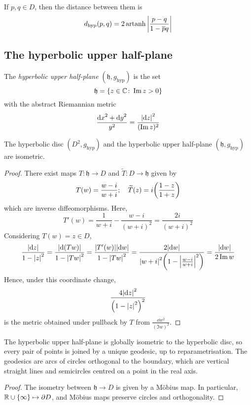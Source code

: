 \begin{corollary}
	If \( p, q \in D \), then the distance between them is
	\[
		d_{\text{hyp}}(p,q) = 2 \operatorname{artanh} \abs{\frac{p-q}{1-\overline p q}}
	\]
\end{corollary}

\subsection{The hyperbolic upper half-plane}
\begin{definition}
	The \textit{hyperbolic upper half-plane} \( (\mathfrak{h},g_{\text{hyp}}) \) is the set
	\[
		\mathfrak{h} = \qty{z \in \mathbb C \colon \Im z > 0}
	\]
	with the abstract Riemannian metric
	\[
		\frac{\dd{x}^2 + \dd{y}^2}{y^2} = \frac{\abs{\dd{z}}^2}{(\Im z)^2}
	\]
\end{definition}
\begin{lemma}
	The hyperbolic disc \( (D^2, g_{\text{hyp}}) \) and the hyperbolic upper half-plane \( (\mathfrak{h},g_{\text{hyp}}) \) are isometric.
\end{lemma}
\begin{proof}
	There exist maps \( T \colon \mathfrak{h} \to D \) and \( \widetilde T \colon D \to \mathfrak{h} \) given by
	\[
		T(w) = \frac{w-i}{w+i};\quad \widetilde T(z) = i\qty(\frac{1-z}{1+z})
	\]
	which are inverse diffeomorphisms.
	Here,
	\[
		T'(w) = \frac{1}{w+i} - \frac{w-i}{(w+i)^2} = \frac{2i}{(w+i)^2}
	\]
	Considering \( T(w) = z \in D \),
	\[
		\frac{\abs{\dd{z}}}{1-\abs{z}^2} = \frac{\abs{\dd{(Tw)}}}{1-\abs{T w}^2} = \frac{\abs{T'(w)} \abs{\dd{w}}}{1-\abs{Tw}^2} = \frac{2 \abs{\dd{w}}}{\abs{w+i}^2 \qty(1 - \abs{\frac{w-i}{w+i}}^2)} = \frac{\abs{\dd{w}}}{2\Im w}
	\]
	Hence, under this coordinate change,
	\[
		\frac{4 \abs{\dd{z}}^2}{\qty(1 - \abs{z}^2)^2}
	\]
	is the metric obtained under pullback by \( T \) from \( \frac{\dd{w}^2}{(\Im w)^2} \).
\end{proof}
\begin{corollary}
	The hyperbolic upper half-plane is globally isometric to the hyperbolic disc, so every pair of points is joined by a unique geodesic, up to reparametrisation.
	The geodesics are arcs of circles orthogonal to the boundary, which are vertical straight lines and semicircles centred on a point in the real axis.
\end{corollary}
\begin{proof}
	The isometry between \( \mathfrak{h} \to D \) is given by a M\"obius map.
	In particular, \( \mathbb R \cup \qty{\infty} \mapsto \partial D \), and M\"obius maps preserve circles and orthogonality.
\end{proof}
